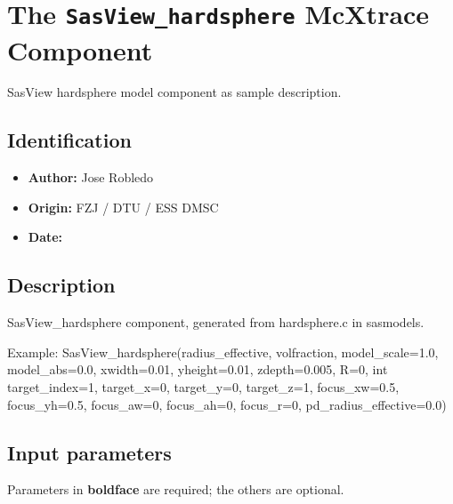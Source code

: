 \section{The \texttt{SasView\_hardsphere} McXtrace Component}
SasView hardsphere model component as sample description.

\subsection*{Identification}
\begin{itemize}
  \item \textbf{Author:} Jose Robledo
  \item \textbf{Origin:} FZJ / DTU / ESS DMSC
  \item \textbf{Date:} 
\end{itemize}

\subsection*{Description}
SasView\_hardsphere component, generated from hardsphere.c in sasmodels.

Example: SasView\_hardsphere(radius\_effective, volfraction, model\_scale=1.0, model\_abs=0.0, xwidth=0.01, yheight=0.01, zdepth=0.005, R=0, int target\_index=1, target\_x=0, target\_y=0, target\_z=1, focus\_xw=0.5, focus\_yh=0.5, focus\_aw=0, focus\_ah=0, focus\_r=0, pd\_radius\_effective=0.0)

\subsection*{Input parameters}
Parameters in \textbf{boldface} are required; the others are optional.

